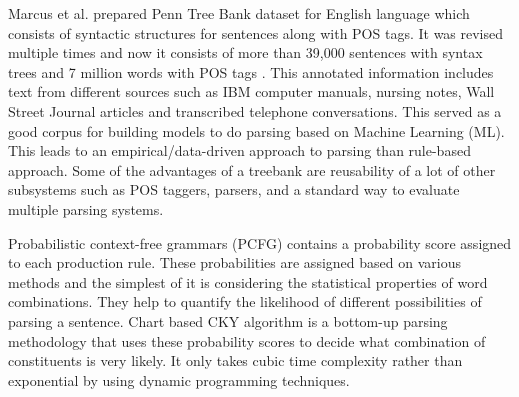 \documentclass[a4paper, 11pt]{article}
\begin{document}

Marcus et al.\parencite{Marcus1993} prepared Penn Tree Bank dataset for English language which consists of syntactic structures for sentences along with POS tags. It was revised multiple times and now it consists of more than 39,000 sentences with syntax trees and 7 million words with POS tags \parencite{Taylor2003}. This annotated information includes text from different sources such as IBM computer manuals, nursing notes, Wall Street Journal articles and transcribed telephone conversations. This served as a good corpus for building models to do parsing based on Machine Learning (ML). This leads to an empirical/data-driven approach to parsing than rule-based approach. Some of the advantages of a treebank are reusability of a lot of other subsystems such as POS taggers, parsers, and a standard way to evaluate multiple parsing systems. 


Probabilistic context-free grammars (PCFG) \parencite{4569603} contains a probability score assigned to each production rule. These probabilities are assigned based on various methods and the simplest of it is considering the statistical properties of word combinations. They help to quantify the likelihood of different possibilities of parsing a sentence. Chart based CKY \parencite{YOUNGER1967189} algorithm is a bottom-up parsing methodology that uses these probability scores to decide what combination of constituents is very likely. It only takes cubic time complexity rather than exponential by using dynamic programming techniques. 
\end{document}
